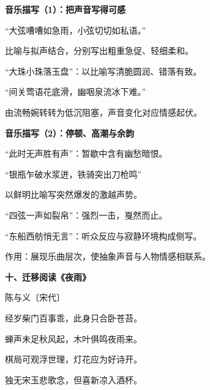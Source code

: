 \documentclass[UTF8,10pt,aspectratio=169]{ctexbeamer}
\newcommand{\PageHeading}[1]{\begin{center}{\Large\bfseries #1}\end{center}\vspace{0.2cm}}
\begin{document}
\begin{frame}
\PageHeading{音乐描写（1）：把声音写得可感}
“大弦嘈嘈如急雨，小弦切切如私语。”\par\vspace{0.23cm}
比喻与拟声结合，分别写出粗重急促、轻细柔和。\par\vspace{0.23cm}
“大珠小珠落玉盘”：以比喻写清脆圆润、错落有致。\par\vspace{0.23cm}
“间关莺语花底滑，幽咽泉流冰下难。”\par\vspace{0.23cm}
由流畅婉转转为低沉阻塞，声音变化对应情感起伏。\par\vspace{0.23cm}
\end{frame}
\begin{frame}
\PageHeading{音乐描写（2）：停顿、高潮与余韵}
“此时无声胜有声”：暂歇中含有幽愁暗恨。\par\vspace{0.23cm}
“银瓶乍破水浆迸，铁骑突出刀枪鸣”\par\vspace{0.23cm}
以鲜明比喻写突然爆发的激越声势。\par\vspace{0.23cm}
“四弦一声如裂帛”：强烈一击，戛然而止。\par\vspace{0.23cm}
“东船西舫悄无言”：听众反应与寂静环境构成侧写。\par\vspace{0.23cm}
作用：展现乐曲层次，使抽象声音与人物情感相联系。\par\vspace{0.23cm}
\end{frame}
\begin{frame}
\PageHeading{十、迁移阅读《夜雨》}
陈与义〔宋代〕\par\vspace{0.23cm}
经岁柴门百事乖，此身只合卧苍苔。\par\vspace{0.23cm}
蝉声未足秋风起，木叶俱鸣夜雨来。\par\vspace{0.23cm}
棋局可观浮世理，灯花应为好诗开。\par\vspace{0.23cm}
独无宋玉悲歌念，但喜新凉入酒杯。\par\vspace{0.23cm}
\end{frame}
\end{document}
